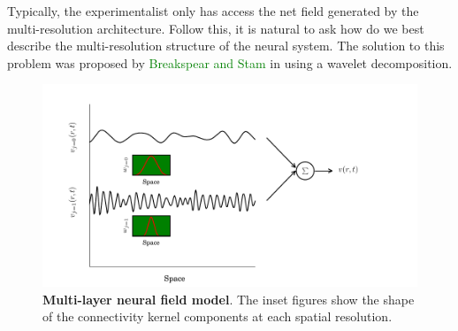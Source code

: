 \documentclass[11pt,draftcls,onecolumn,peerreview]{IEEEtran}
\newcommand{\dean}[1]{\textcolor{green}{#1}}
\begin{document}
Typically, the experimentalist only has access the net field generated by the multi-resolution architecture. Follow this, it is natural to ask how do we best describe the multi-resolution structure of the neural system. The solution to this problem was proposed by \dean{Breakspear and Stam} in using a wavelet decomposition.  
\begin{figure}[t]
	\centering
		\includegraphics[scale=1]{./Graph/MultiResNeuralField.pdf}
	\caption{{\bf Multi-layer neural field model}. The inset figures show the shape of the
connectivity kernel components at each spatial resolution.}
	\label{fig:MultiLayerFieldModel}
\end{figure}
\end{document}
